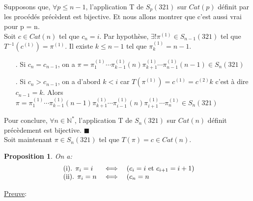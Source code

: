 \documentclass[12pt,a4paper]{extreport}
\newtheorem{proposition}{Proposition}[chapter]
\begin{document}
		Supposons que, $\forall p \leq n-1$, l'application T de $S_{p}(321)$ sur $Cat(p)$ définit par les procédés précèdent est bijective. Et nous allons montrer que c'est aussi vrai pour p = n.\\
		Soit $c \in Cat(n)$ tel que $c_{n}=i$. Par hypothèse, $\exists! \pi^{(1)} \in S_{n-1}(321) $ tel que $T^{-1}(c^{(1)})=\pi^{(1)}$. Il existe $k\leq n-1 $ tel que $\pi^{(1)}_{k}=n-1$.
		\begin{itemize}
			\item[.] Si $c_{n} =c_{n-1} $, on a $ \pi = \pi^{(1)}_{1} \cdots \pi^{(1)}_{k-1}(n)\pi^{(1)}_{k+1} \cdots \pi^{(1)}_{n-1}(n-1) \in S_{n}(321) $
			\item[.] Si $c_{n} > c_{n-1} $, on a d'abord $k<i$ car $ T(\pi^{(1)})= c^{(1)} = c^{(2)}k$ c'est à dire $c_{n-1}=k$. Alors
			$\pi = \pi^{(1)}_{1} \cdots \pi^{(1)}_{k-1}(n-1)\pi^{(1)}_{k+1} \cdots \pi^{(1)}_{i-1} (n) \pi^{(1)}_{i+1} \cdots  \pi^{(1)}_{n} \in S_{n}(321) $ 
		\end{itemize}
		Pour conclure, $\forall n \in \mathbb{N}^{*}$,  l'application T de $S_{n}(321)$ sur $Cat(n)$ définit précèdement est bijective. $\blacksquare$\\
		Soit maintenant $\pi \in S_{n}(321) $ tel que $T(\pi) = c \in Cat(n) $.
		\begin{proposition}
		On a:
			\[
				\begin{array} {l l l}
					\text{ (i). } \pi_{i} = i &\iff &(c_{i}=i \text{ et } c_{i+1} = i+1 )\\
					\text{ (ii). }\pi_{i} = n &\iff& (c_{n}=n 
				\end{array}
			\]
		\end{proposition}
		\underline{Preuve}:\\
\end{document}
